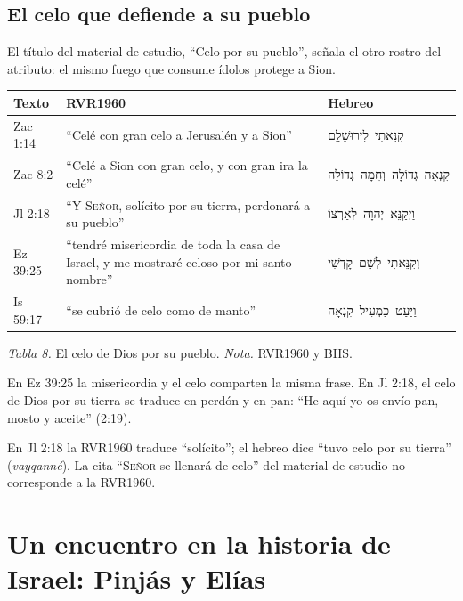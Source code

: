 \documentclass[11pt,letterpaper]{article}
\newcommand{\heb}[1]{\mbox{\foreignlanguage{hebrew}{#1}}}
\newcommand{\SENOR}{\textsc{Señor}}
\begin{document}
\subsection{El celo que defiende a su pueblo}
El título del material de estudio, ``Celo por su pueblo'', señala el otro rostro del atributo: el mismo fuego que consume ídolos protege a Sion.

\begin{center}\small\renewcommand{\arraystretch}{1.18}
\begin{tabular}{@{}L{1.8cm}L{7.4cm}L{4.6cm}@{}}
\toprule
\textbf{Texto} & \textbf{RVR1960} & \textbf{Hebreo} \\ \midrule
Zac 1:14 & ``Celé con gran celo a Jerusalén y a Sion'' & \heb{קִנֵּאתִי לִירוּשָׁלִַם} \\
Zac 8:2 & ``Celé a Sion con gran celo, y con gran ira la celé'' & \heb{קִנְאָה גְדוֹלָה וְחֵמָה גְדוֹלָה} \\
Jl 2:18 & ``Y \SENOR, solícito por su tierra, perdonará a su pueblo'' & \heb{וַיְקַנֵּא יְהוָה לְאַרְצוֹ} \\
Ez 39:25 & ``tendré misericordia de toda la casa de Israel, y me mostraré celoso por mi santo nombre'' & \heb{וְקִנֵּאתִי לְשֵׁם קָדְשִׁי} \\
Is 59:17 & ``se cubrió de celo como de manto'' & \heb{וַיַּעַט כַּמְעִיל קִנְאָה} \\
\bottomrule
\end{tabular}\par
{\footnotesize\color{gris}\textit{Tabla 8.} El celo de Dios por su pueblo. \textit{Nota.} RVR1960 y BHS.}
\end{center}

En Ez 39:25 la misericordia y el celo comparten la misma frase. En Jl 2:18, el celo de Dios por su tierra se traduce en perdón y en pan: ``He aquí yo os envío pan, mosto y aceite'' (2:19).

\begin{nota}[Precisión]
En Jl 2:18 la RVR1960 traduce ``solícito''; el hebreo dice ``tuvo celo por su tierra'' (\emph{vayqanné}). La cita ``\SENOR{} se llenará de celo'' del material de estudio no corresponde a la RVR1960.
\end{nota}

\section{Un encuentro en la historia de Israel: Pinjás y Elías}
\end{document}
